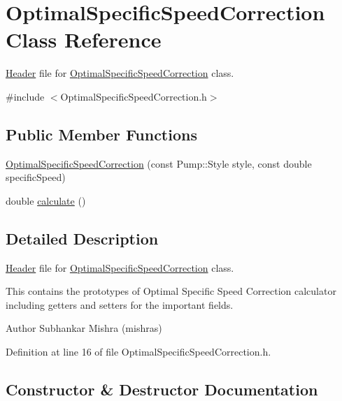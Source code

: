 \hypertarget{class_optimal_specific_speed_correction}{}\section{Optimal\+Specific\+Speed\+Correction Class Reference}
\label{class_optimal_specific_speed_correction}


\hyperlink{class_header}{Header} file for \hyperlink{class_optimal_specific_speed_correction}{Optimal\+Specific\+Speed\+Correction} class.  




{\ttfamily \#include $<$Optimal\+Specific\+Speed\+Correction.\+h$>$}

\subsection*{Public Member Functions}
\begin{DoxyCompactItemize}
\item 
\hyperlink{class_optimal_specific_speed_correction_a8af4972dfd79881d9c9c9b0f47d922b9}{Optimal\+Specific\+Speed\+Correction} (const Pump\+::\+Style style, const double specific\+Speed)
\item 
double \hyperlink{class_optimal_specific_speed_correction_a3337ebde4e64c20f19adbda6204fa0be}{calculate} ()
\end{DoxyCompactItemize}


\subsection{Detailed Description}
\hyperlink{class_header}{Header} file for \hyperlink{class_optimal_specific_speed_correction}{Optimal\+Specific\+Speed\+Correction} class. 

This contains the prototypes of Optimal Specific Speed Correction calculator including getters and setters for the important fields.

\begin{DoxyAuthor}{Author}
Subhankar Mishra (mishras) 
\end{DoxyAuthor}


Definition at line 16 of file Optimal\+Specific\+Speed\+Correction.\+h.



\subsection{Constructor \& Destructor Documentation}
\mbox{\label{class_optimal_specific_speed_correction_a8af4972dfd79881d9c9c9b0f47d922b9}} 
